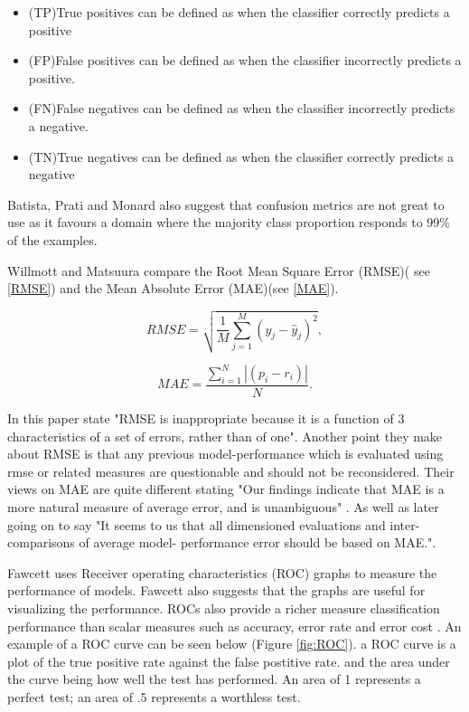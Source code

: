 \begin{itemize}
  \item (TP)True positives can be defined as when the classifier correctly predicts a positive
  \item (FP)False positives can be defined as when the classifier incorrectly predicts a positive.  
  \item (FN)False negatives can be defined as when the classifier incorrectly predicts a negative.
  \item (TN)True negatives can be defined as when the classifier correctly predicts a negative
\end{itemize}


Batista, Prati and Monard also suggest that confusion metrics are not great to use as it favours a domain where the majority class proportion responds to 99\% of the examples.


Willmott and Matsuura compare the Root Mean Square Error (RMSE)( see \ref{RMSE}) and the Mean Absolute Error (MAE)(see \ref{MAE}).

\begin{equation}
   RMSE = \sqrt{{\frac{1}{M}}\sum\limits_{j=1}^{M}(y_j-\hat{y}_j)^2},
   \label{RMSE}
\end{equation}

\begin{equation}
    MAE = \frac{\sum_{i=1}^N |(p_i - r_i)|}{N}.
    \label{MAE}
\end{equation}

In this paper \cite{10.2307/24869236} state "RMSE is inappropriate because it is a function of 3 characteristics of a set of errors, rather than of one". Another point they make about RMSE is that any previous model-performance which is evaluated using rmse or related measures are questionable and should not be reconsidered. Their views on MAE are quite different stating "Our findings indicate that MAE is a more natural measure of average error, and is unambiguous" \cite{10.2307/24869236}. As well as later going on to say "It seems to us that all dimensioned evaluations and inter-comparisons of average model- performance error should be based on MAE."\cite{10.2307/24869236}.

Fawcett uses Receiver operating characteristics (ROC) graphs to measure the performance of models. Fawcett also suggests that the graphs are useful for visualizing the performance. ROCs also provide a richer measure classification performance than scalar measures such as accuracy, error rate and error cost \cite{FAWCETT2006861}. An example of a ROC curve can be seen below (Figure \ref{fig:ROC}). a ROC curve is a plot of the true positive rate against the false postitive rate. and the area under the curve being how well the test has performed. An area of 1 represents a perfect test; an area of .5 represents a worthless test.


